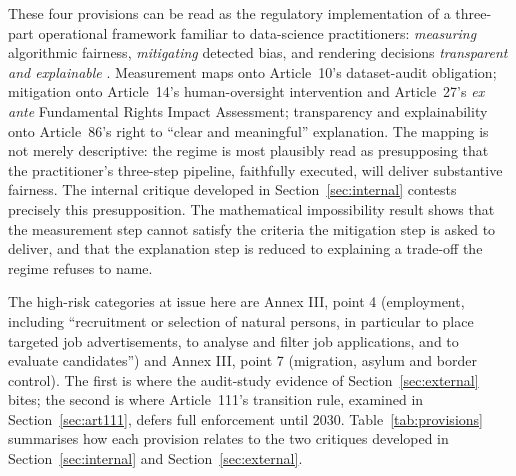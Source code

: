 \documentclass[12pt]{article}
\begin{document}
These four provisions can be read as the regulatory implementation of a three-part operational framework familiar to data-science practitioners: \emph{measuring} algorithmic fairness, \emph{mitigating} detected bias, and rendering decisions \emph{transparent and explainable} \citep{benitez2026}. Measurement maps onto Article~10's dataset-audit obligation; mitigation onto Article~14's human-oversight intervention and Article~27's \emph{ex ante} Fundamental Rights Impact Assessment; transparency and explainability onto Article~86's right to \enquote{clear and meaningful} explanation. The mapping is not merely descriptive: the regime is most plausibly read as presupposing that the practitioner's three-step pipeline, faithfully executed, will deliver substantive fairness. The internal critique developed in Section~\ref{sec:internal} contests precisely this presupposition. The mathematical impossibility result shows that the measurement step cannot satisfy the criteria the mitigation step is asked to deliver, and that the explanation step is reduced to explaining a trade-off the regime refuses to name.

The high-risk categories at issue here are Annex III, point 4 (employment, including \enquote{recruitment or selection of natural persons, in particular to place targeted job advertisements, to analyse and filter job applications, and to evaluate candidates}) and Annex III, point 7 (migration, asylum and border control). The first is where the audit-study evidence of Section~\ref{sec:external} bites; the second is where Article~111's transition rule, examined in Section~\ref{sec:art111}, defers full enforcement until 2030. Table~\ref{tab:provisions} summarises how each provision relates to the two critiques developed in Section~\ref{sec:internal} and Section~\ref{sec:external}.
\end{document}
